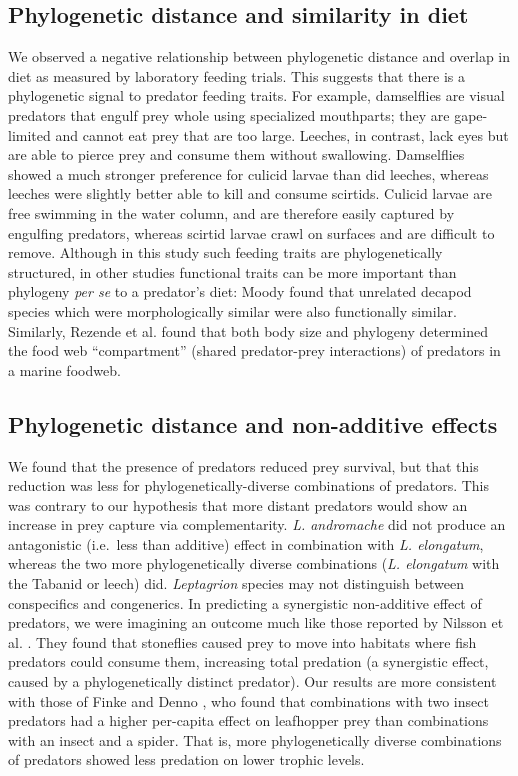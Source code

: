 \documentclass[11pt]{article}
\begin{document}
\subsection*{Phylogenetic distance and similarity in diet}

We observed a negative relationship between phylogenetic distance and
overlap in diet as measured by laboratory feeding trials. This suggests
that there is a phylogenetic signal to predator feeding traits. For
example, damselflies are visual predators that engulf prey whole using
specialized mouthparts; they are gape-limited and cannot eat prey that
are too large. Leeches, in contrast, lack eyes but are able to pierce
prey and consume them without swallowing. Damselflies showed a much
stronger preference for culicid larvae than did leeches, whereas leeches
were slightly better able to kill and consume scirtids. Culicid larvae
are free swimming in the water column, and are therefore easily captured
by engulfing predators, whereas scirtid larvae crawl on surfaces and are
difficult to remove. Although in this study such feeding traits are
phylogenetically structured, in other studies functional traits can be
more important than phylogeny \emph{per se} to a predator's diet: Moody
\citeyearpar{Moody1993} found that unrelated decapod species which were
morphologically similar were also functionally similar. Similarly,
Rezende et al. \citeyearpar{Rezende2009} found that both body size and
phylogeny determined the food web ``compartment'' (shared predator-prey
interactions) of predators in a marine foodweb.

\subsection*{Phylogenetic distance and non-additive effects}

We found that the presence of predators reduced prey survival, but that
this reduction was less for phylogenetically-diverse combinations of
predators. This was contrary to our hypothesis that more distant
predators would show an increase in prey capture via complementarity.
\emph{L. andromache} did not produce an antagonistic (i.e.~less than
additive) effect in combination with \emph{L. elongatum}, whereas the
two more phylogenetically diverse combinations (\emph{L. elongatum} with
the Tabanid or leech) did. \emph{Leptagrion} species may not distinguish
between conspecifics and congenerics. In predicting a synergistic
non-additive effect of predators, we were imagining an outcome much like
those reported by Nilsson et al. \citeyearpar{Nilsson2006c}. They found
that stoneflies caused prey to move into habitats where fish predators
could consume them, increasing total predation (a synergistic effect,
caused by a phylogenetically distinct predator). Our results are more
consistent with those of Finke and Denno \citeyearpar{Finke2005}, who
found that combinations with two insect predators had a higher
per-capita effect on leafhopper prey than combinations with an insect
and a spider. That is, more phylogenetically diverse combinations of
predators showed less predation on lower trophic levels.
\end{document}
